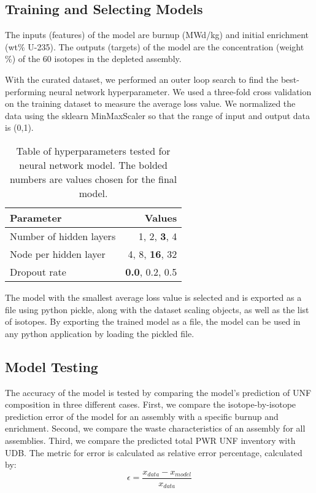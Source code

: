 \subsection{Training and Selecting Models}

The inputs (features) of the model are
burnup (MWd/kg) and initial enrichment (wt\% U-235).
The outputs (targets) of the model are
the concentration (weight \%) of the 60 isotopes in the
depleted assembly.

With the curated dataset, we performed an outer loop
search to find the best-performing neural network
hyperparameter. We used a three-fold
cross validation on the training dataset to
measure the average loss value. We
normalized the data using the sklearn MinMaxScaler
so that the range of input and output data is (0,1).

\begin{table}[h]
    \centering
    \begin{tabular}{lr}
        \hline
        Parameter & Values \\
        \hline
        Number of hidden layers & 1, 2, \textbf{3}, 4 \\
        Node per hidden layer & 4, 8, \textbf{16}, 32 \\
        Dropout rate & \textbf{0.0}, 0.2, 0.5 \\
        \hline
    \end{tabular}
    \caption{Table of hyperparameters tested
             for neural network model. The bolded
             numbers are values chosen for the final model.}
\end{table}

The model with the smallest average loss value
is selected and is exported as a file using python
pickle, along with the dataset scaling objects, as well as
the list of isotopes. By exporting the trained model
as a file, the model can be used in any python
application by loading the pickled file.


\subsection{Model Testing}

The accuracy of the model is tested by comparing
the model's prediction of \gls{UNF} composition
in three different cases. First, we compare the
isotope-by-isotope prediction error of the model for an
assembly with a specific burnup and enrichment.
Second, we compare the waste characteristics of
an assembly for all assemblies. Third, we compare
the predicted total \gls{PWR} \gls{UNF} inventory with
\gls{UDB}. The metric for error is calculated as
relative error percentage, calculated by:
\begin{equation}
\epsilon = \frac{x_{data} - x_{model}}{x_{data}}
\end{equation}

